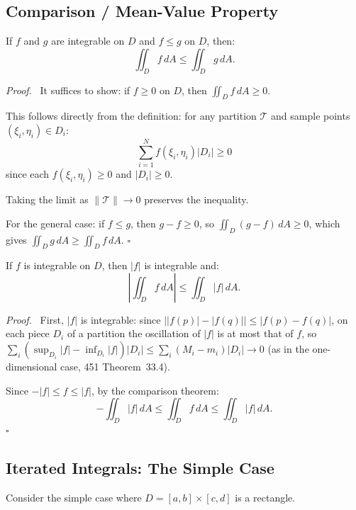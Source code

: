 \documentclass[11pt]{report}
\renewenvironment{proof}[1][Proof]{\par\noindent\textit{#1.}\ }{\hfill$\square$\par\medskip}
\begin{document}
\subsection*{Comparison / Mean-Value Property}

\begin{theorem}
If $f$ and $g$ are integrable on $D$ and $f \leq g$ on $D$, then:
\[
\iint_D f \, dA \leq \iint_D g \, dA.
\]
\end{theorem}

\begin{proof}
It suffices to show: if $f \geq 0$ on $D$, then $\iint_D f \, dA \geq 0$.

This follows directly from the definition: for any partition $\mathcal{T}$ and sample points $(\xi_i, \eta_i) \in D_i$:
\[
\sum_{i=1}^{N} f(\xi_i, \eta_i) |D_i| \geq 0
\]
since each $f(\xi_i, \eta_i) \geq 0$ and $|D_i| \geq 0$.

Taking the limit as $\|\mathcal{T}\| \to 0$ preserves the inequality.

For the general case: if $f \leq g$, then $g - f \geq 0$, so $\iint_D (g - f) \, dA \geq 0$, which gives $\iint_D g \, dA \geq \iint_D f \, dA$.
\end{proof}

\begin{corollary}
If $f$ is integrable on $D$, then $|f|$ is integrable and:
\[
\left| \iint_D f \, dA \right| \leq \iint_D |f| \, dA.
\]
\end{corollary}

\begin{proof}
First, $|f|$ is integrable: since $\big||f(p)| - |f(q)|\big| \leq |f(p) - f(q)|$, on each piece $D_i$ of a partition the oscillation of $|f|$ is at most that of $f$, so $\sum_i (\sup_{D_i}|f| - \inf_{D_i}|f|)|D_i| \leq \sum_i (M_i - m_i)|D_i| \to 0$ (as in the one-dimensional case, 451 Theorem~33.4).

Since $-|f| \leq f \leq |f|$, by the comparison theorem:
\[
-\iint_D |f| \, dA \leq \iint_D f \, dA \leq \iint_D |f| \, dA.
\]
\end{proof}

\subsection*{Iterated Integrals: The Simple Case}

Consider the simple case where $D = [a, b] \times [c, d]$ is a rectangle.
\end{document}

